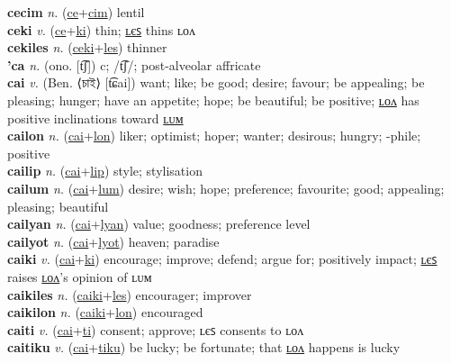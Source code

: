 \textbf{cecim} \textit{n.} (\hyperref[ce]{ce}+\hyperref[cim]{cim})
lentil \label{cecim} \\
\textbf{ceki} \textit{v.} (\hyperref[ce]{ce}+\hyperref[ki]{ki})
thin; \hyperref[cekiles]{ʟєꜱ} thins ʟᴏᴧ \label{ceki} \\
\textbf{cekiles} \textit{n.} (\hyperref[ceki]{ceki}+\hyperref[les]{les})
thinner \label{cekiles} \\
\textbf{'ca} \textit{n.} (ono. [t͡ʃ])
c; /t͡ʃ/; post-alveolar affricate \label{'ca} \\
\textbf{cai} \textit{v.} (Ben. ⟨চাই⟩ [t͡ɕai])
want; like; be good; desire; favour; be appealing; be pleasing; hunger; have an appetite; hope; be beautiful; be positive; \hyperref[cailon]{ʟᴏᴧ} has positive inclinations toward \hyperref[cailum]{ʟᴜᴍ} \label{cai} \\
\textbf{cailon} \textit{n.} (\hyperref[cai]{cai}+\hyperref[lon]{lon})
liker; optimist; hoper; wanter; desirous; hungry; -phile; positive \label{cailon} \\
\textbf{cailip} \textit{n.} (\hyperref[cai]{cai}+\hyperref[lip]{lip})
style; stylisation \label{cailip} \\
\textbf{cailum} \textit{n.} (\hyperref[cai]{cai}+\hyperref[lum]{lum})
desire; wish; hope; preference; favourite; good; appealing; pleasing; beautiful \label{cailum} \\
\textbf{cailyan} \textit{n.} (\hyperref[cai]{cai}+\hyperref[lyan]{lyan})
value; goodness; preference level \label{cailyan} \\
\textbf{cailyot} \textit{n.} (\hyperref[cai]{cai}+\hyperref[lyot]{lyot})
heaven; paradise \label{cailyot} \\
\textbf{caiki} \textit{v.} (\hyperref[cai]{cai}+\hyperref[ki]{ki})
encourage; improve; defend; argue for; positively impact; \hyperref[caikiles]{ʟєꜱ} raises \hyperref[caikilon]{ʟᴏᴧ}’s opinion of ʟᴜᴍ \label{caiki} \\
\textbf{caikiles} \textit{n.} (\hyperref[caiki]{caiki}+\hyperref[les]{les})
encourager; improver \label{caikiles} \\
\textbf{caikilon} \textit{n.} (\hyperref[caiki]{caiki}+\hyperref[lon]{lon})
encouraged \label{caikilon} \\
\textbf{caiti} \textit{v.} (\hyperref[cai]{cai}+\hyperref[ti]{ti})
consent; approve; ʟєꜱ consents to ʟᴏᴧ \label{caiti} \\
\textbf{caitiku} \textit{v.} (\hyperref[cai]{cai}+\hyperref[tiku]{tiku})
be lucky; be fortunate; that \hyperref[caitikulon]{ʟᴏᴧ} happens is lucky \label{caitiku} \\
